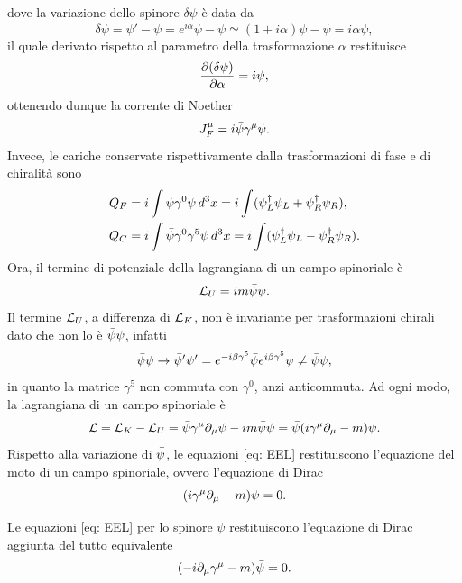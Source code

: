 dove la variazione dello spinore $\delta\psi$ è data da
\begin{equation}
    \delta\psi = \psi' - \psi = e^{i\alpha}\psi - \psi \simeq (1+i\alpha)\psi - \psi = i\alpha\psi,
\end{equation}
il quale derivato rispetto al parametro della trasformazione $\alpha$ restituisce 
\begin{equation}
    \frac{\partial(\delta\psi)}{\partial\alpha} = i\psi,
\end{equation}
ottenendo dunque la corrente di Noether
\begin{equation}
    J^\mu_F = i\bar{\psi}\gamma^\mu\psi.
\end{equation}
Invece, le cariche conservate rispettivamente dalla trasformazioni di fase e di chiralità sono
\begin{align}
    Q_F &= i\int\bar{\psi}\gamma^0\psi\,d^3x = i\int(\psi_L^\dagger\psi_L + \psi^\dagger_R\psi_R), \\
    Q_C &= i\int\bar{\psi}\gamma^0\gamma^5\psi\,d^3x = i\int(\psi_L^\dagger\psi_L - \psi^\dagger_R\psi_R).
\end{align}
Ora, il termine di potenziale della lagrangiana di un campo spinoriale è
\begin{equation}
    \mathcal{L}_U = im\bar{\psi}\psi.
\end{equation}
Il termine $\mathcal{L}_U$, a differenza di $\mathcal{L}_K$, non è invariante per trasformazioni chirali dato che non lo è $\bar{\psi}\psi$, infatti
\begin{equation}
    \bar{\psi}\psi\to\bar{\psi}'\psi' = e^{-i\beta\gamma^5}\bar{\psi} e^{i\beta\gamma^5}\psi\neq\bar{\psi}\psi,
\end{equation}
in quanto la matrice $\gamma^5$ non commuta con $\gamma^0$, anzi anticommuta. Ad ogni modo, la lagrangiana di un campo spinoriale è
\begin{equation}
\label{eq: lagrangiana campo spinoriale}
    \mathcal{L} = \mathcal{L}_K - \mathcal{L}_U = \bar{\psi}\gamma^\mu\partial_\mu\psi - im\bar{\psi}\psi = \bar{\psi}(i\gamma^\mu\partial_\mu - m)\psi.
\end{equation}
Rispetto alla variazione di $\bar{\psi}$, le equazioni \eqref{eq: EEL} restituiscono l'equazione del moto di un campo spinoriale, ovvero l'equazione di Dirac
\begin{equation}
\label{eq: equazione di Dirac}
    (i\gamma^\mu\partial_\mu - m)\psi = 0.
\end{equation}
\begin{obs}
    Le equazioni \eqref{eq: EEL} per lo spinore $\psi$ restituiscono l'equazione di Dirac aggiunta del tutto equivalente
    \begin{equation}
        (-i\partial_\mu\gamma^\mu -m)\bar{\psi} = 0.
    \end{equation}
\end{obs}




